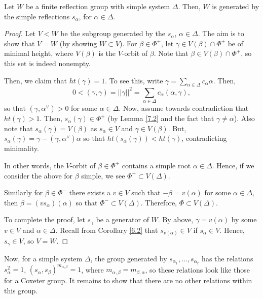 \begin{theorem} \label{8.2}
Let $W$ be a finite reflection group with simple system $\Delta$. Then, $W$ is
generated by the simple reflections $s_\alpha$, for $\alpha \in \Delta$.
\end{theorem}

\begin{proof}
Let $V < W$ be the subgroup generated by the $s_\alpha$, $\alpha \in \Delta$.
The aim is to show that $V = W$ (by showing $W \subset V$).
For $\beta \in \Phi^+$, let $\gamma \in V(\beta) \cap \Phi^+$ be of minimal
height, where $V(\beta)$ is the $V$-orbit of $\beta$. Note that $\beta \in V(\beta)
\cap \Phi^+$, so this set is indeed nonempty.

Then, we claim that $ht(\gamma) = 1$. To see this, write
$\gamma = \sum_{\alpha \in \Delta} c_\alpha \alpha$. Then,
\[
    0 < (\gamma, \gamma) = ||\gamma||^2 = \sum_{\alpha \in \Delta}
    c_\alpha (\alpha, \gamma),
\]
so that $(\gamma, \alpha^\vee) > 0$ for some $\alpha \in \Delta$. Now, assume towards
contradiction that $ht(\gamma) > 1$. Then, $s_\alpha(\gamma) \in \Phi^+$
(by Lemma \ref{7.2} and the fact that $\gamma \neq \alpha$). Also note that
$s_\alpha(\gamma) = V(\beta)$ as $s_\alpha \in V$ and $\gamma \in V(\beta)$.
But, $s_\alpha(\gamma) = \gamma - (\gamma, \alpha^\vee) \alpha$ so that
$ht(s_\alpha(\gamma)) < ht(\gamma)$, contradicting minimality.

In other words, the $V$-orbit of $\beta \in \Phi^+$ contains a simple root
$\alpha \in \Delta$. Hence, if we consider the above for $\beta$ simple, we
see $\Phi^+ \subset V(\Delta)$.

Similarly for $\beta \in \Phi^-$ there exists a $v \in V$ such that $-\beta
= v(\alpha)$ for some $\alpha \in \Delta$, then $\beta = (v s_\alpha)(\alpha)$
so that $\Phi^- \subset V(\Delta)$.
Therefore, $\Phi \subset V(\Delta)$.

To complete the proof, let $s_\gamma$ be a generator of $W$. By above,
$\gamma = v(\alpha)$ by some $v \in V$ and $\alpha \in \Delta$. Recall from
Corollary \ref{6.2} that $s_{v(\alpha)} \in V$ if $s_\alpha \in V$. Hence,
$s_\gamma \in V$, so $V = W$.
\end{proof}

Now, for a simple system $\Delta$, the group generated by $s_{\alpha_1}, \dots,
s_{\alpha_r}$ has the relations $s_\alpha^2 = 1$, $(s_\alpha, s_\beta)^{m_{\alpha, \beta}}
= 1$, where $m_{\alpha, \beta} = m_{\beta, \alpha}$, so these relations look
like those for a Coxeter group. It remains to show that there are no other
relations within this group.
